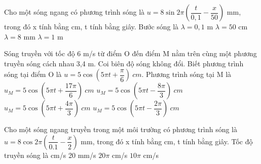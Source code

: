 \begin{ex}%
Cho một sóng ngang có phương trình sóng là $u=8\sin2\pi \left(\dfrac{t}{0,1} - \dfrac{x}{50}\right)$ mm, trong đó x tính bằng cm, t tính bằng giây. Bước sóng là
\choice
{$\lambda=0,1$ m}
{\True $\lambda=50$ cm}
{$\lambda=8$ mm}
{$\lambda=1$ m}
\loigiai{
}
\end{ex} 
\begin{ex}%
Sóng truyền với tốc độ 6 m/s từ điểm O đến điểm M nằm trên cùng một phương truyền sóng cách nhau 3,4 m. Coi biên độ sóng không đổi. Biết phương trình sóng tại điểm O là $u=5\cos(5\pi t+\dfrac{\pi}{6})\ cm.$ Phương trình sóng tại M là
\choice
{$u_M=5\cos(5\pi t+\dfrac{17\pi}{6})\ cm$}
{\True $u_M=5\cos(5\pi t-\dfrac{8\pi}{3})\ cm$}
{$u_M=5\cos(5\pi t+\dfrac{4\pi}{3})\ cm$}
{$u_M=5\cos(5\pi t-\dfrac{2\pi}{3})\ cm$}
\end{ex} 

\begin{ex}%
Cho một sóng ngang truyền trong một môi trường có phương trình sóng là $u=8\cos 2\pi \left( \dfrac{t}{0. 1}-\dfrac{x}{2} \right)$ mm, trong đó x tính bằng cm, t tính bằng giây. Tốc độ truyền sóng là
\choice
{ cm/s}
{20 mm/s}
{$20\pi$ cm/s}
{$10\pi$ cm/s}
\end{ex} 






